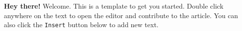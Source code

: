 \textbf{Hey there!} Welcome. This is a template to get you started. Double click anywhere on the text to open the editor and contribute to the article. You can also click the \verb|Insert| button below to add new text. 